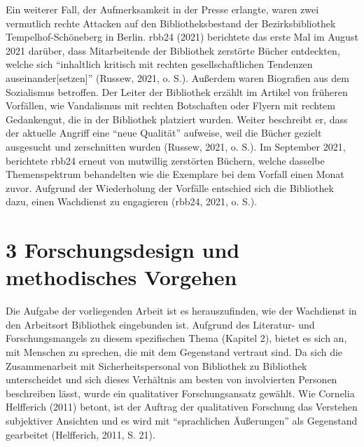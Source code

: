 \documentclass[a4paper,
fontsize=11pt,
oneside,
numbers=noperiodatend,
parskip=half-,
bibliography=totoc,
final
]{scrartcl}
\begin{document}
Ein weiterer Fall, der Aufmerksamkeit in der Presse erlangte, waren zwei
vermutlich rechte Attacken auf den Bibliotheksbestand der
Bezirksbibliothek Tempelhof-Schöneberg in Berlin. rbb24 (2021)
berichtete das erste Mal im August 2021 darüber, dass Mitarbeitende der
Bibliothek zerstörte Bücher entdeckten, welche sich \enquote{inhaltlich
kritisch mit rechten gesellschaftlichen Tendenzen
auseinander{[}setzen{]}} (Russew, 2021, o. S.). Außerdem waren
Biografien aus dem Sozialismus betroffen. Der Leiter der Bibliothek
erzählt im Artikel von früheren Vorfällen, wie Vandalismus mit rechten
Botschaften oder Flyern mit rechtem Gedankengut, die in der Bibliothek
platziert wurden. Weiter beschreibt er, dass der aktuelle Angriff eine
\enquote{neue Qualität} aufweise, weil die Bücher gezielt ausgesucht und
zerschnitten wurden (Russew, 2021, o. S.). Im September 2021, berichtete
rbb24 erneut von mutwillig zerstörten Büchern, welche dasselbe
Themenspektrum behandelten wie die Exemplare bei dem Vorfall einen Monat
zuvor. Aufgrund der Wiederholung der Vorfälle entschied sich die
Bibliothek dazu, einen Wachdienst zu engagieren (rbb24, 2021, o. S.).

\hypertarget{forschungsdesign-und-methodisches-vorgehen}{%
\section{3 Forschungsdesign und methodisches
Vorgehen}\label{forschungsdesign-und-methodisches-vorgehen}}

Die Aufgabe der vorliegenden Arbeit ist es herauszufinden, wie der
Wachdienst in den Arbeitsort Bibliothek eingebunden ist. Aufgrund des
Literatur- und Forschungsmangels zu diesem spezifischen Thema (Kapitel
2), bietet es sich an, mit Menschen zu sprechen, die mit dem Gegenstand
vertraut sind. Da sich die Zusammenarbeit mit Sicherheitspersonal von
Bibliothek zu Bibliothek unterscheidet und sich dieses Verhältnis am
besten von involvierten Personen beschreiben lässt, wurde ein
qualitativer Forschungsansatz gewählt. Wie Cornelia Helfferich (2011)
betont, ist der Auftrag der qualitativen Forschung das Verstehen
subjektiver Ansichten und es wird mit \enquote{sprachlichen Äußerungen}
als Gegenstand gearbeitet (Helfferich, 2011, S. 21).
\end{document}
